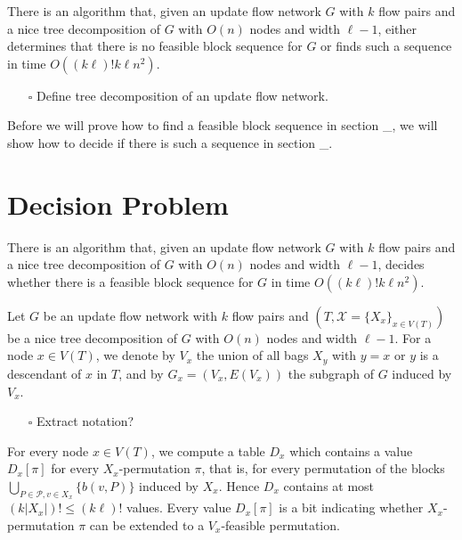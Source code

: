\documentclass[fontsize=11pt,paper=a4]{book}
\begin{document}
\begin{thm}
There is an algorithm that, given an update flow network \(G\) with \(k\) flow pairs and a nice tree decomposition of \(G\) with \(O(n)\) nodes and width \(\ell-1\), either determines that there is no feasible block sequence for \(G\) or finds such a sequence in time \(O((k\ell)!k\ell n^2)\).
\label{org803541e}
\end{thm}

\begin{itemize}
\item[{$\square$}] Define tree decomposition of an update flow network.
\end{itemize}


Before we will prove how to find a feasible block sequence in section \_, we will show how to decide if there is such a sequence in section \_.

\chapter{Decision Problem}
\label{sec:org5bd35f9}

\begin{thm}
There is an algorithm that, given an update flow network \(G\) with \(k\) flow pairs and a nice tree decomposition of \(G\) with \(O(n)\) nodes and width \(\ell-1\), decides whether there is a feasible block sequence for \(G\) in time \(O((k\ell)!k\ell n^2)\).
\label{orgc7898ff}
\end{thm}

Let \(G\) be an update flow network with \(k\) flow pairs and \((T,\mathcal{X}=\{X_x\}_{x\in V(T)})\) be a nice tree decomposition of \(G\) with \(O(n)\) nodes and width \(\ell-1\).
For a node \(x\in V(T)\), we denote by \(V_x\) the union of all bags \(X_y\) with \(y=x\) or \(y\) is a descendant of \(x\) in \(T\), and by \(G_x=(V_x,E(V_x))\) the subgraph of \(G\) induced by \(V_x\).

\begin{itemize}
\item[{$\square$}] Extract notation?
\end{itemize}


For every node \(x\in V(T)\), we compute a table \(D_x\) which contains a value \(D_x[\pi]\) for every \(X_x\)-permutation \(\pi\), that is, for every permutation of the blocks \(\bigcup_{P\in\mathcal{P},v\in X_x}\{b(v,P)\}\) induced by \(X_x\).
Hence \(D_x\) contains at most \((k\lvert X_x\rvert)!\leq(k\ell)!\) values.
Every value \(D_x[\pi]\) is a bit indicating whether \(X_x\)-permutation \(\pi\) can be extended to a \(V_x\)-feasible permutation.
\end{document}
